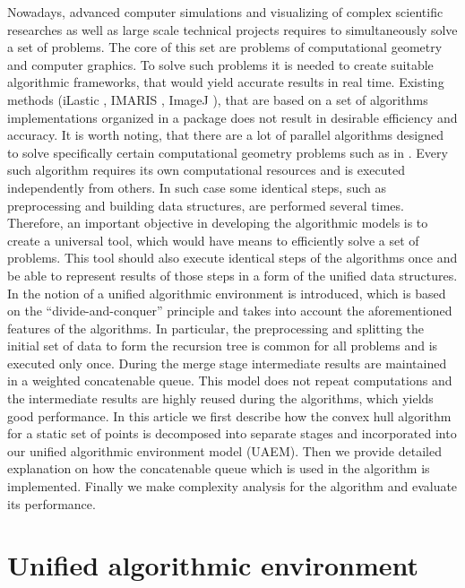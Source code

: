 \documentclass[twoside,twocolumn,10pt]{article}
\begin{document}
\copyrightspace
	Nowadays, advanced computer simulations and visualizing of complex scientific researches as well as large scale technical projects requires to simultaneously solve a set of problems. The core of this set are problems of computational geometry and computer graphics. To solve such problems it is needed to create suitable algorithmic frameworks, that would yield accurate results in real time. Existing methods (iLastic \cite{ilastik}, IMARIS \cite{imaris}, ImageJ \cite{imagej}), that are based on a set of algorithms implementations organized in a package does not result in desirable efficiency and accuracy. It is worth noting, that there are a lot of parallel algorithms designed to solve specifically certain computational geometry problems such as in \cite{aggarwal,atallah,cole,amato,chen,berkman,goodman,akl,jaja,leeuwen,reif}. Every such algorithm requires its own computational resources and is executed independently from others. In such case some identical steps, such as preprocessing and building data structures, are performed several times.
	Therefore, an important objective in developing the algorithmic models is to create a universal tool, which would have means to efficiently solve a set of problems. This tool should also execute identical steps of the algorithms once and be able to represent results of those steps in a form of the unified data structures. In \cite{tereshchenko} the notion of a unified algorithmic environment is introduced, which is based on the ``divide-and-conquer'' principle and takes into account the aforementioned features of the algorithms. In particular, the preprocessing and splitting the initial set of data to form the recursion tree is common for all problems and is executed only once. During the merge stage intermediate results are maintained in a weighted concatenable queue. This model does not repeat computations and the intermediate results are highly reused during the algorithms, which yields good performance.
	In this article we first describe how the convex hull algorithm for a static set of points is decomposed into separate stages and incorporated into our unified algorithmic environment model (UAEM). Then we provide detailed explanation on how the concatenable queue which is used in the algorithm is implemented. Finally we make complexity analysis for the algorithm and evaluate its performance.
\section{Unified algorithmic environment}
\label{sec:unified-algorithmic-environment}
\end{document}
